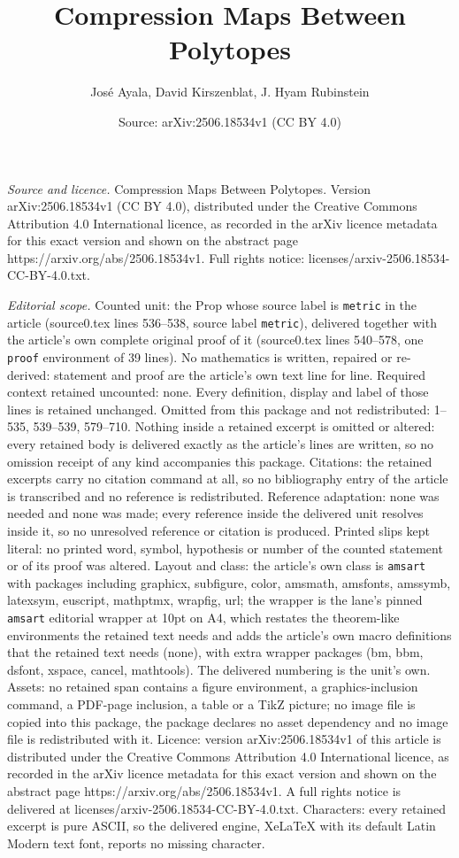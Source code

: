 \documentclass[10pt,a4paper]{amsart}
\title[Compression Maps Between Polytopes]{Compression Maps Between Polytopes}
\author{Jos\'e Ayala, David Kirszenblat, J. Hyam Rubinstein}
\date{Source: arXiv:2506.18534v1 (CC BY 4.0)}
\begin{document}
\maketitle

\noindent\emph{Source and licence.} Compression Maps Between Polytopes. Version arXiv:2506.18534v1 (CC BY 4.0), distributed under the Creative Commons Attribution 4.0 International licence, as recorded in the arXiv licence metadata for this exact version and shown on the abstract page https://arxiv.org/abs/2506.18534v1. Full rights notice: licenses/arxiv-2506.18534-CC-BY-4.0.txt.\par\smallskip

\noindent\textit{Editorial scope.} Counted unit: the Prop whose source label is \texttt{metric} in the article (source0.tex lines 536--538, source label \texttt{metric}), delivered together with the article's own complete original proof of it (source0.tex lines 540--578, one \texttt{proof} environment of 39 lines). No mathematics is written, repaired or re-derived: statement and proof are the article's own text line for line. Required context retained uncounted: none. Every definition, display and label of those lines is retained unchanged. Omitted from this package and not redistributed: 1--535, 539--539, 579--710. Nothing inside a retained excerpt is omitted or altered: every retained body is delivered exactly as the article's lines are written, so no omission receipt of any kind accompanies this package. Citations: the retained excerpts carry no citation command at all, so no bibliography entry of the article is transcribed and no reference is redistributed. Reference adaptation: none was needed and none was made; every reference inside the delivered unit resolves inside it, so no unresolved reference or citation is produced. Printed slips kept literal: no printed word, symbol, hypothesis or number of the counted statement or of its proof was altered. Layout and class: the article's own class is \texttt{amsart} with packages including graphicx, subfigure, color, amsmath, amsfonts, amssymb, latexsym, euscript, mathptmx, wrapfig, url; the wrapper is the lane's pinned \texttt{amsart} editorial wrapper at 10pt on A4, which restates the theorem-like environments the retained text needs and adds the article's own macro definitions that the retained text needs (none), with extra wrapper packages (bm, bbm, dsfont, xspace, cancel, mathtools). The delivered numbering is the unit's own. Assets: no retained span contains a figure environment, a graphics-inclusion command, a PDF-page inclusion, a table or a TikZ picture; no image file is copied into this package, the package declares no asset dependency and no image file is redistributed with it. Licence: version arXiv:2506.18534v1 of this article is distributed under the Creative Commons Attribution 4.0 International licence, as recorded in the arXiv licence metadata for this exact version and shown on the abstract page https://arxiv.org/abs/2506.18534v1. A full rights notice is delivered at licenses/arxiv-2506.18534-CC-BY-4.0.txt. Characters: every retained excerpt is pure ASCII, so the delivered engine, XeLaTeX with its default Latin Modern text font, reports no missing character.
\end{document}
